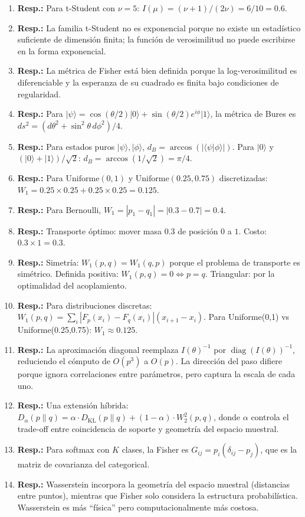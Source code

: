 \begin{enumerate}
	\item \textbf{Resp.:} Para t-Student con $\nu = 5$: $I(\mu) = (\nu+1)/(2\nu) = 6/10 = 0.6$.
	\item \textbf{Resp.:} La familia t-Student no es exponencial porque no existe un estadístico suficiente de dimensión finita; la función de verosimilitud no puede escribirse en la forma exponencial.
	\item \textbf{Resp.:} La métrica de Fisher está bien definida porque la log-verosimilitud es diferenciable y la esperanza de su cuadrado es finita bajo condiciones de regularidad.
	\item \textbf{Resp.:} Para $|\psi\rangle = \cos(\theta/2)|0\rangle + \sin(\theta/2)e^{i\phi}|1\rangle$, la métrica de Bures es $ds^2 = (d\theta^2 + \sin^2\theta \, d\phi^2)/4$.
	\item \textbf{Resp.:} Para estados puros $|\psi\rangle, |\phi\rangle$, $d_B = \arccos(|\langle\psi|\phi\rangle|)$. Para $|0\rangle$ y $(|0\rangle+|1\rangle)/\sqrt{2}$: $d_B = \arccos(1/\sqrt{2}) = \pi/4$.
	\item \textbf{Resp.:} Para $\mathrm{Uniforme}(0,1)$ y $\mathrm{Uniforme}(0.25,0.75)$ discretizadas: $W_1 = 0.25 \times 0.25 + 0.25 \times 0.25 = 0.125$.
	\item \textbf{Resp.:} Para Bernoulli, $W_1 = |p_1 - q_1| = |0.3 - 0.7| = 0.4$.
	\item \textbf{Resp.:} Transporte óptimo: mover masa $0.3$ de posición $0$ a $1$.  Costo: $0.3 \times 1 = 0.3$.
	\item \textbf{Resp.:} Simetría: $W_1(p,q) = W_1(q,p)$ porque el problema de transporte es simétrico.  Definida positiva: $W_1(p,q) = 0 \iff p = q$.  Triangular: por la optimalidad del acoplamiento.
	\item \textbf{Resp.:} Para distribuciones discretas: $W_1(p,q) = \sum_i |F_p(x_i) - F_q(x_i)| (x_{i+1}-x_i)$. Para Uniforme(0,1) vs Uniforme(0.25,0.75): $W_1 \approx 0.125$.
	\item \textbf{Resp.:} La aproximación diagonal reemplaza $I(\theta)^{-1}$ por $\operatorname{diag}(I(\theta))^{-1}$, reduciendo el cómputo de $O(p^3)$ a $O(p)$. La dirección del paso difiere porque ignora correlaciones entre parámetros, pero captura la escala de cada uno.
	\item \textbf{Resp.:} Una extensión híbrida: $D_\alpha(p\|q) = \alpha \cdot D_{\mathrm{KL}}(p\|q) + (1-\alpha) \cdot W_2^2(p,q)$, donde $\alpha$ controla el trade-off entre coincidencia de soporte y geometría del espacio muestral.
	\item \textbf{Resp.:} Para softmax con $K$ clases, la Fisher es $G_{ij} = p_i(\delta_{ij} - p_j)$, que es la matriz de covarianza del categorical.
	\item \textbf{Resp.:} Wasserstein incorpora la geometría del espacio muestral (distancias entre puntos), mientras que Fisher solo considera la estructura probabilística.  Wasserstein es más ``física'' pero computacionalmente más costosa.
\end{enumerate}
